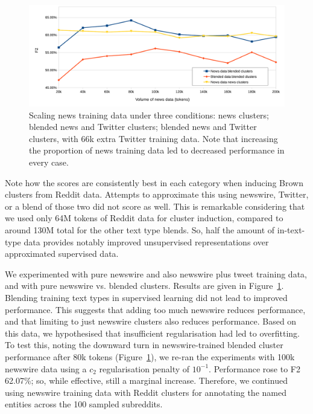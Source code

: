 \documentclass[acmsmall]{acmart}
\begin{document}
\begin{figure}
\centering
\includegraphics[width=\columnwidth]{entity-chunking/chart-results-rcv-crop.pdf}
\caption{Scaling news training data under three conditions: news clusters; blended news and Twitter clusters; blended news and Twitter clusters, with 66k extra Twitter training data. Note that increasing the proportion of news training data led to decreased performance in every case.}
\label{fig:rcv-scaling}
\end{figure}

Note how the scores are consistently best in each category when inducing Brown clusters from Reddit data.
Attempts to approximate this using newswire, Twitter, or a blend of those two did not score as well.
This is remarkable considering that we used only 64M tokens of Reddit data for cluster induction, compared to around 130M total for the other text type blends.
So, half the amount of in-text-type data provides notably improved unsupervised representations over approximated supervised data.

We experimented with pure newswire and also newswire plus tweet training data, and with pure newswire vs. blended clusters.
Results are given in Figure~\ref{fig:rcv-scaling}.
Blending training text types in supervised learning did not lead to improved performance.
This suggests that adding too much newswire reduces performance, and that limiting to just newswire clusters also reduces performance.
Based on this data, we hypothesised that insufficient regularisation had led to overfitting.
To test this, noting the downward turn in newswire-trained blended cluster performance after 80k tokens (Figure~\ref{fig:rcv-scaling}), we re-ran the experiments with 100k newswire data using a $c_2$ regularisation penalty of $10^{-1}$. %
Performance rose to F2 62.07\%; so, while effective, still a marginal increase.
Therefore, we continued using newswire training data with Reddit clusters for annotating the named entities across the 100 sampled subreddits.%
\end{document}
